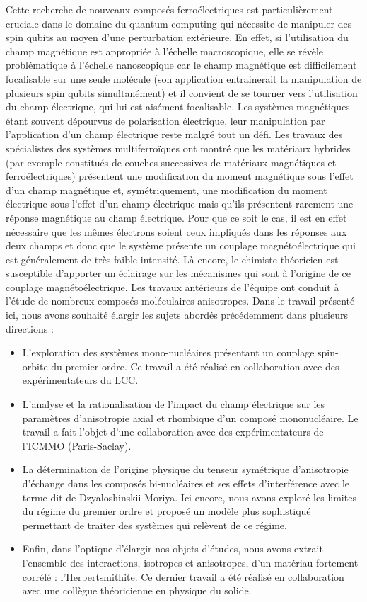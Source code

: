 \documentclass[12pt,a4paper]{report}
\numberwithin{equation}{section}
\begin{document}
Cette recherche de nouveaux composés ferroélectriques est particulièrement cruciale dans le domaine du quantum computing qui nécessite de manipuler des spin qubits au moyen d’une perturbation extérieure.
En effet, si l'utilisation du champ magnétique est appropriée à l'échelle macroscopique, elle se révèle problématique à l’échelle nanoscopique car le champ magnétique est difficilement focalisable sur une seule molécule (son application entrainerait la manipulation de plusieurs spin qubits simultanément) et il convient de se tourner vers l'utilisation du champ électrique, qui lui est aisément focalisable. 
Les systèmes magnétiques étant souvent dépourvus de polarisation électrique, leur manipulation par l'application d'un champ électrique reste malgré tout un défi.
Les travaux des spécialistes des systèmes multiferroïques ont montré que les matériaux hybrides (par exemple constitués de couches successives de matériaux magnétiques et ferroélectriques) présentent une modification du moment magnétique sous l'effet d'un champ magnétique et, symétriquement, une modification du moment électrique sous l'effet d'un champ électrique mais qu'ils présentent rarement une réponse magnétique au champ électrique. Pour que ce soit le cas, il est en effet nécessaire que les mêmes électrons soient ceux impliqués dans les réponses aux deux champs et donc que le système présente un couplage magnétoélectrique qui est généralement de très faible intensité.
Là encore, le chimiste théoricien est susceptible d’apporter un éclairage sur les mécanismes qui sont à l’origine de ce couplage magnétoélectrique.  
Les travaux antérieurs de l’équipe ont conduit à l’étude de nombreux composés moléculaires anisotropes. 
Dans le travail présenté ici, nous avons souhaité élargir les sujets abordés précédemment dans plusieurs directions :
\begin{itemize}
  \item[-] L’exploration des systèmes mono-nucléaires présentant un couplage spin-orbite du premier ordre. Ce travail a été réalisé en collaboration avec des expérimentateurs du LCC. 
  \item[-] L’analyse et la rationalisation de l’impact du champ électrique sur les paramètres d’anisotropie axial et rhombique d’un composé mononucléaire. Le travail a fait l’objet d’une collaboration avec des expérimentateurs de l'ICMMO (Paris-Saclay). 
  \item[-] La détermination de l’origine physique du tenseur symétrique d’anisotropie d’échange dans les composés bi-nucléaires et ses effets d’interférence avec le terme dit de Dzyaloshinskii-Moriya. Ici encore, nous avons exploré les limites du régime du premier ordre et proposé un modèle plus sophistiqué permettant de traiter des systèmes qui relèvent de ce régime. 
  \item[-] Enfin, dans l’optique d’élargir nos objets d’études, nous avons extrait l’ensemble des interactions, isotropes et anisotropes, d’un matériau fortement corrélé : l’Herbertsmithite. Ce dernier travail a été réalisé en collaboration avec une collègue théoricienne en physique du solide.

\end{itemize}
\end{document}
